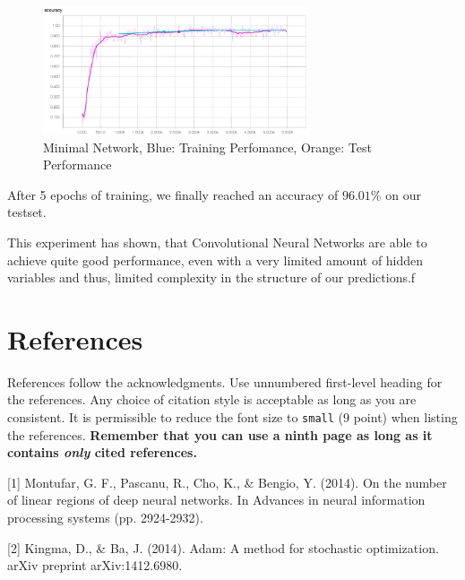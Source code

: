 \documentclass{article}
\begin{document}
\begin{figure}[h]
\centering
\includegraphics[width=0.7\textwidth]{imgs/acc_min.png}
\caption{Minimal Network, Blue: Training Perfomance, Orange: Test Performance}
\end{figure}

After 5 epochs of training, we finally reached an accuracy of $96.01\%$ on our testset.

This experiment has shown, that Convolutional Neural Networks are able to achieve quite good performance, even with a very limited amount of hidden variables and thus, limited complexity in the structure of our predictions.f


\section*{References}

References follow the acknowledgments. Use unnumbered first-level
heading for the references. Any choice of citation style is acceptable
as long as you are consistent. It is permissible to reduce the font
size to \verb+small+ (9 point) when listing the references. {\bf
  Remember that you can use a ninth page as long as it contains
  \emph{only} cited references.}
\medskip

\small

[1] Montufar, G. F., Pascanu, R., Cho, K., \& Bengio, Y. (2014). On the number of linear regions of deep neural networks. In Advances in neural information processing systems (pp. 2924-2932).

[2] Kingma, D., \& Ba, J. (2014). Adam: A method for stochastic optimization. arXiv preprint arXiv:1412.6980.
\end{document}
